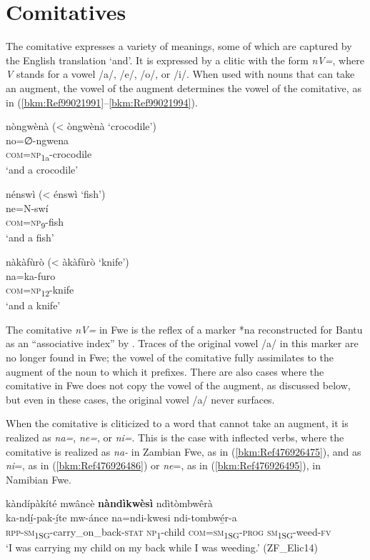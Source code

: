 \section{Comitatives}
\label{bkm:Ref486270340}\hypertarget{Toc75352653}{}
The comitative expresses a variety of meanings, some of which are captured by the English translation ‘and’. It is expressed by a clitic with the form \textit{nV=}, where \textit{V} stands for a vowel /a/, /e/, /o/, or /i/. When used with nouns that can take an augment, the vowel of the augment determines the vowel of the comitative, as in (\ref{bkm:Ref99021991}--\ref{bkm:Ref99021994}).

\ea
\label{bkm:Ref99021991}
nòngwènà (< òngwènà ‘crocodile’)\\
no=∅-ngwena\\
\textsc{com}=\textsc{np}\textsubscript{1a}-crocodile\\
\glt ‘and a crocodile’
\z

\ea
nénswì (< énswì ‘fish’)\\
ne=N-swí\\
\textsc{com}=\textsc{np}\textsubscript{9}-fish\\
\glt ‘and a fish’
\z

\ea
\label{bkm:Ref99021994}
nàkàfùrò (< àkàfùrò ‘knife’)\\
na=ka-furo\\
\textsc{com}=\textsc{np}\textsubscript{12}-knife\\
\glt ‘and a knife’
\z

The comitative \textit{nV=} in Fwe is the reflex of a marker *na reconstructed for Bantu as an “associative index” by {\citet{Meeussen1967}}. Traces of the original vowel /a/ in this marker are no longer found in Fwe; the vowel of the comitative fully assimilates to the augment of the noun to which it prefixes. There are also cases where the comitative in Fwe does not copy the vowel of the augment, as discussed below, but even in these cases, the original vowel /a/ never surfaces.

When the comitative is cliticized to a word that cannot take an augment, it is realized as \textit{na=}, \textit{ne=}, or \textit{ni=}. This is the case with inflected verbs, where the comitative is realized as \textit{na-} in Zambian Fwe, as in (\ref{bkm:Ref476926475}), and as \textit{ni}=, as in (\ref{bkm:Ref476926486}) or \textit{ne}=, as in (\ref{bkm:Ref476926495}), in Namibian Fwe.

\ea
\label{bkm:Ref476926475}
kàndípàkíté mwâncè \textbf{nàndìkwèsì} ndìtòmbwêrà\\
\gll ka-ndí̲-pak-í̲te      mw-ánce na=ndi-kwesi  ndi-tombwé̲r-a\\
\textsc{rpp}-\textsc{sm}\textsubscript{1SG}-carry\_on\_back-\textsc{stat}  \textsc{np}\textsubscript{1}-child 
\textsc{com}=\textsc{sm}\textsubscript{1SG}-\textsc{prog}  \textsc{sm}\textsubscript{1SG}-weed-\textsc{fv}\\
\glt ‘I was carrying my child on my back while I was weeding.’ (ZF\_Elic14)
\z

